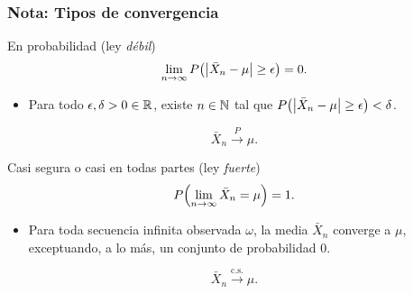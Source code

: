\documentclass[table]{beamer}
\begin{document}


\begin{frame}
    \frametitle{Nota: Tipos de convergencia}
    \begin{block}{En probabilidad (ley \emph{débil})}
        \begin{equation*}
            \lim_{n \rightarrow \infty} \prob{\vparens{\bar{X}_{n} - \mu} \geq \epsilon} = 0 .
        \end{equation*}
        \begin{itemize}
            \item Para todo $\epsilon, \delta > 0 \in \mathbb{R}$, existe $n \in \mathbb{N}$ tal que $\prob{\vparens{\bar{X}_{n} - \mu} \geq \epsilon} < \delta$.
        \end{itemize}
        \begin{equation*}
            \bar{X}_{n} \overset{P}{\to} \mu .
        \end{equation*}
    \end{block}
    \begin{block}{Casi segura o casi en todas partes (ley \emph{fuerte})}
        \begin{equation*}
            \prob{\lim_{n \rightarrow \infty} \bar{X}_{n} = \mu} = 1 .
        \end{equation*}
        \begin{itemize}
            \item Para toda secuencia infinita observada $\omega$, la media $\bar{X}_{n}$ converge a $\mu$, exceptuando, a lo más, un conjunto de probabilidad $0$.
        \end{itemize}
        \begin{equation*}
            \bar{X}_{n} \overset{\text{c.s.}}{\to} \mu .
        \end{equation*}
    \end{block}
\end{frame}
\end{document}
